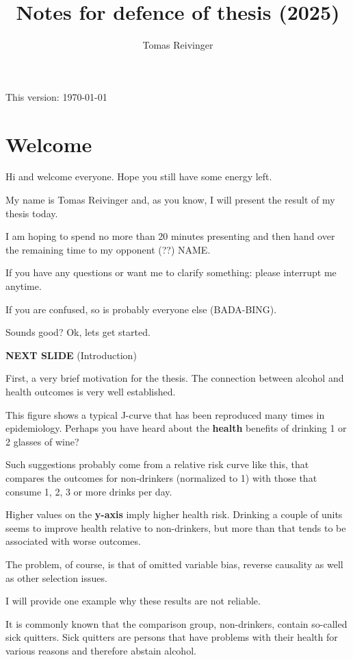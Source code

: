 \documentclass[12pt]{article}
\title{Notes for defence of thesis (2025)}
\date{}
\author{Tomas Reivinger}
\begin{document}
\maketitle
\thispagestyle{empty} %
\begin{center} This version: \today\end{center}

\section{Welcome}
Hi and welcome everyone. Hope you still have some energy left.

My name is Tomas Reivinger and, as you know, I will present the result of my thesis today. 

I am hoping to spend no more than 20 minutes presenting and then hand over the remaining time to my opponent (??) NAME. 

If you have any questions or want me to clarify something: please interrupt me anytime. 

If you are confused, so is probably everyone else (BADA-BING).

Sounds good? Ok, lets get started.

\textbf{NEXT SLIDE} (Introduction)

First, a very brief motivation for the thesis. The connection between alcohol and health outcomes is very well established. 

This figure shows a typical J-curve that has been reproduced many times in epidemiology. Perhaps you have heard about the  \textbf{health} benefits of drinking 1 or 2 glasses of wine? 

Such suggestions probably come from a relative risk curve like this, that compares the outcomes for non-drinkers (normalized to 1) with those that consume 1, 2, 3 or more drinks per day. 

Higher values on the  \textbf{y-axis} imply higher health risk. Drinking a couple of units seems to improve health relative to non-drinkers, but more than that tends to be associated with worse outcomes.

The problem, of course, is that of omitted variable bias, reverse causality as well as other selection issues. 

I will provide one example why these results are not reliable. 

It is commonly known that the comparison group,  non-drinkers, contain so-called sick quitters. Sick quitters are persons that have problems with their health for various reasons and therefore abstain alcohol.
\end{document}
